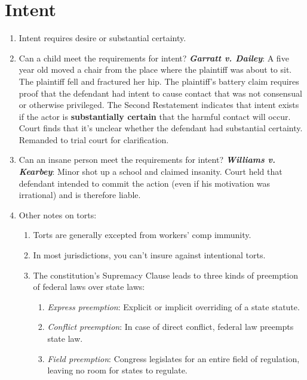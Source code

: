 \section{Intent}

\begin{enumerate}
    \item Intent requires desire or substantial certainty.
    \item Can a child meet the requirements for intent? \textbf{\emph{Garratt v. Dailey}}: A five year old moved a chair from the place where the plaintiff was about to sit. The plaintiff fell and fractured her hip. The plaintiff's battery claim requires proof that the defendant had intent to cause contact that was not consensual or otherwise privileged. The Second Restatement indicates that intent exists if the actor is \textbf{substantially certain} that the harmful contact will occur. Court finds that it's unclear whether the defendant had substantial certainty. Remanded to trial court for clarification.
    \item Can an insane person meet the requirements for intent? \textbf{\emph{Williams v. Kearbey}}: Minor shot up a school and claimed insanity. Court held that defendant intended to commit the action (even if his motivation was irrational) and is therefore liable.
    \item Other notes on torts:
    \begin{enumerate}
        \item Torts are generally excepted from workers' comp immunity.
        \item In most jurisdictions, you can't insure against intentional torts.
        \item The constitution's Supremacy Clause leads to three kinds of preemption of federal laws over state laws:
        \begin{enumerate}
            \item \emph{Express preemption}: Explicit or implicit overriding of a state statute.
            \item \emph{Conflict preemption}: In case of direct conflict, federal law preempts state law.
            \item \emph{Field preemption}: Congress legislates for an entire field of regulation, leaving no room for states to regulate.
        \end{enumerate}
    \end{enumerate}
\end{enumerate}
